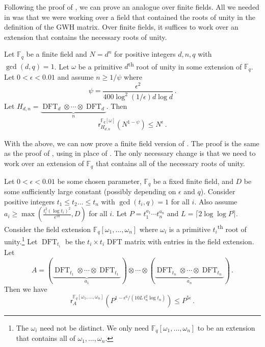 \documentclass{toc}
\newcommand\F{{\mathbb{F}}}
\newcommand{\ts}{\textsuperscript}
\DeclareMathOperator{\DFT}{DFT}
\begin{document}
Following the proof of , we can prove an analogue over finite fields.  All we needed in  was that we were working over a field that contained the roots of unity in the definition of the GWH matrix.  Over finite fields, it suffices to work over an extension that contains the necessary roots of unity. 

\begin{theorem} \label{Hadamard_finitefield}
Let $\F_q$ be a finite field and $N = d^n$ for positive integers $d,n,q$ with $\gcd(d,q) = 1$.  Let $\omega$ be a primitive $d$\ts{th} root of unity in some extension of $\F_q$.  Let $0 < \epsilon < 0.01 $ and assume $n \geq 1/\psi$ where \[\psi = \frac{\epsilon^2 }{400\log^2 (1/\epsilon) d \log d} \,.\]  Let $H_{d,n} = \underbrace{\DFT_d \otimes \cdots \otimes \DFT_d}_{n}$. Then
\[
\textsf{r}_{H_{d,n}}^{\F_q[\omega]}\left(N^{1 - \psi}\right) \leq N^{ \epsilon} \,.
\]
\end{theorem}


With the above, we can now prove a finite field version of .  The proof is the same as the proof of , using  in place of .  The only necessary change is that we need to work over an extension of $\F_q$ that contains all of the necessary roots of unity. 
\begin{lemma}\label{finitefield_productbound}
Let $0 < \epsilon < 0.01$ be some chosen parameter, $\F_q$ be a fixed finite field, and $D$ be some sufficiently large constant (possibly depending on $\epsilon$ and $q$).  Consider positive integers $t_1 \leq t_2 \dots \leq t_n$ with $\gcd(t_i,q) = 1$ for all $i$.  Also assume $a_i \geq \max\left(\frac{t_i^2(\log t_i)^2}{\epsilon^{10}}, D \right)$ for all $i$.  Let $P = t_1^{a_1} \cdots t_n^{a_n}$ and $L = \lceil2 \log \log P \rceil$.  Consider the field extension $\F_q[\omega_1, \dots , \omega_n]$ where $\omega_i$ is a primitive $t_i$\ts{th} root of unity.\footnote{The $\omega_i$ need not be distinct.  We only need $\F_q[\omega_1, \dots , \omega_n]$ to be an extension that contains all of $\omega_1, \dots , \omega_n$.}  Let %
$\DFT_{t_i}$ %
be the $t_i \times t_i$ %
DFT %
matrix with entries %
in %
the field extension.  Let
%
%
%
 \[
A = (\underbrace{\DFT_{t_1} \otimes \cdots \otimes \DFT_{t_1}}_\text{$a_1$}) \otimes \cdots \otimes  (\underbrace{\DFT_{t_n} \otimes \cdots \otimes \DFT_{t_n}}_\text{$a_n$}) \,.
\]
%
Then we have
\[
\textsf{r}^{\F_q[\omega_1, \dots , \omega_n]}_A\left( P^{1 - \epsilon^6/(10L\,t_n^2 \log t_n)}\right) \leq  P^{5 \epsilon} \,.
\]
\end{lemma}
\end{document}
